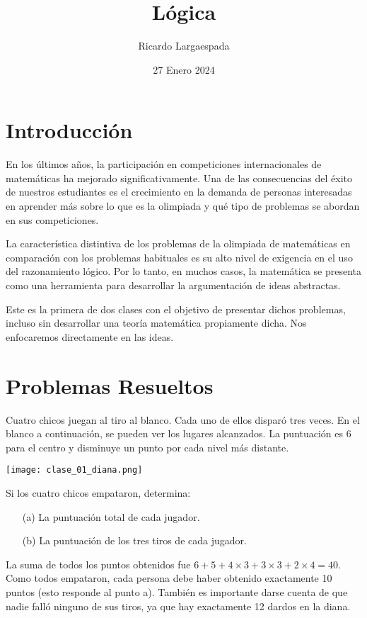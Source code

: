 \documentclass[11pt]{scrartcl}
\begin{document}
\title{Lógica}
\author{Ricardo Largaespada}
\date{27 Enero 2024}

\maketitle

\section{Introducción}

En los últimos años, la participación en competiciones internacionales de matemáticas ha mejorado significativamente. Una de las consecuencias del éxito de nuestros estudiantes es el crecimiento en la demanda de personas interesadas en aprender más sobre lo que es la olimpiada y qué tipo de problemas se abordan en sus competiciones.

La característica distintiva de los problemas de la olimpiada de matemáticas en comparación con los problemas habituales es su alto nivel de exigencia en el uso del razonamiento lógico. Por lo tanto, en muchos casos, la matemática se presenta como una herramienta para desarrollar la argumentación de ideas abstractas.

Este es la primera de dos clases con el objetivo de presentar dichos problemas, incluso sin desarrollar una teoría matemática propiamente dicha. Nos enfocaremos directamente en las ideas.

\section{Problemas Resueltos}
\begin{example}
Cuatro chicos juegan al tiro al blanco. Cada uno de ellos disparó tres veces. En el blanco a continuación, se pueden ver los lugares alcanzados. La puntuación es 6 para el centro y disminuye un punto por cada nivel más distante.
\begin{center}
    \texttt{[image: clase\_01\_diana.png]}
\end{center}
Si los cuatro chicos empataron, determina:\begin{itemize}
\item[(a)] La puntuación total de cada jugador.
\item[(b)] La puntuación de los tres tiros de cada jugador.
\end{itemize}
\end{example}
La suma de todos los puntos obtenidos fue $6+5+4\times 3+3\times 3+2\times 4 = 40$. Como todos empataron, cada persona debe haber obtenido exactamente 10 puntos (esto responde al punto a). También es importante darse cuenta de que nadie falló ninguno de sus tiros, ya que hay exactamente 12 dardos en la diana. 
\end{document}
